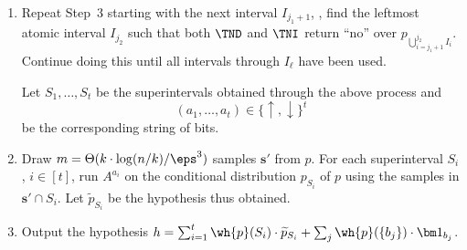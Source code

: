 \begin{algorithm}
\begin{enumerate}
    \emph{Case 1:} If $\widehat{p}[a_{j_1},b_{j_1}]
    \geq 2 \eps/(10k)$, define $I'_{j_1}: = [a_{j_1},b_{j_1}-1]$ and
$b_{j_1}$ is a \emph{heavy} point.

   \emph{Case 2:}  If $\widehat{p}[a_{j_1},b_{j_1}] < 2 \eps/(10k)$ then define $I'_{j_1}:=I_{j_1}$.

   Call $I'_{j_1}$ a \emph{negligible} interval.
  If $j_1 >1$ then define the first \emph{superinterval} $S_1$ to be $\bigcup_{i=1}^{j_1-1} I_i$, and
   set $a_1 \in \{\uparrow,\downarrow\}$ to be $a_1=\uparrow$ if $\TND$
   returned ``yes'' on $p_{\bigcup_{i=1}^{j_1-1} I_i}$ and to be $a_1=\downarrow$ if $\TNI$
   returned ``yes'' on $p_{\bigcup_{i=1}^{j_1-1} I_i}$.


\item Repeat Step~3 starting with the next interval $I_{j_1+1}$,
\ie, find the leftmost atomic interval $I_{j_2}$ such that
both $\TND$ and $\TNI$ return ``no'' over
$p_{\bigcup_{i=j_1+1}^{j_2} I_i}$.
  Continue doing this until
   all intervals through $I_{\ell}$ have been used.


   Let $S_1,\dots,S_t$ be the superintervals obtained through the above process and
  \[
(a_1,\dots,a_t) \in \{\uparrow,\downarrow\}^t
\]
be the corresponding string of bits.


\item Draw $m = \Theta(k \cdot \log (n/k) / \eps^3)$ samples $\mathbf{s}' $ from $p$.
For each superinterval $S_i$, $i\in[t]$, run $A^{a_i}$ on the conditional distribution $p_{S_i}$ of $p$ using the samples in $\mathbf{s}' \cap S_i$.
Let $\widetilde{p}_{S_i}$ be the hypothesis thus obtained.


\item Output the hypothesis $h  =  \sum_{i=1}^t \wh{p}(S_i) \cdot \widetilde{p}_{S_i} +
\sum_j \wh{p} (\{b_j\}) \cdot {\bm 1}_{b_j}$.

\end{enumerate}
\caption{}\label{alg:learn-kmodal}
\end{algorithm}

